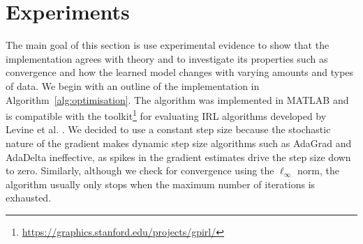 \documentclass{mpaper}
\begin{document}
\section{Experiments} \label{sec:evaluation}

The main goal of this section is use experimental evidence to show that the
implementation agrees with theory and to investigate its properties such as
convergence and how the learned model changes with varying amounts and types of
data. We begin with an outline of the implementation in
Algorithm~\ref{alg:optimisation}. The algorithm was implemented in MATLAB and is
compatible with the
toolkit\footnote{\url{https://graphics.stanford.edu/projects/gpirl/}} for
evaluating IRL algorithms developed by Levine et al.
\cite{DBLP:conf/nips/LevinePK11}. We decided to use a constant step size because
the stochastic nature of the gradient makes dynamic step size algorithms such as
AdaGrad \cite{DBLP:journals/jmlr/DuchiHS11} and AdaDelta
\cite{DBLP:journals/corr/abs-1212-5701} ineffective, as spikes in the gradient
estimates drive the step size down to zero. Similarly, although we check for
convergence using the $\ell_\infty$ norm, the algorithm usually only stops when
the maximum number of iterations is exhausted.
\end{document}
